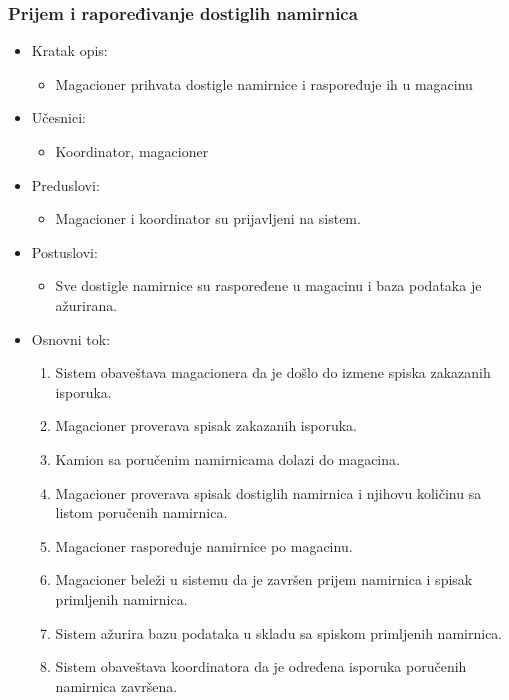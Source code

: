 
\subsubsection{Prijem i rapoređivanje dostiglih namirnica}

	\begin{itemize}
		\item{Kratak opis:} 
		\begin{itemize}
			\item{Magacioner prihvata dostigle namirnice i raspoređuje ih u magacinu}
		\end{itemize}
		\item{Učesnici:} 
		\begin{itemize}
			\item{Koordinator, magacioner}
		\end{itemize}		
		
		\item{Preduslovi:}
		\begin{itemize}
			\item{Magacioner i koordinator su prijavljeni na sistem.}
		\end{itemize}
		
		\item{Postuslovi:}
		\begin{itemize}
			\item{Sve dostigle namirnice su raspoređene u magacinu i baza podataka je ažurirana.}
		\end{itemize}
		
		\item{Osnovni tok:}
		\begin{enumerate}
			\item{Sistem obaveštava magacionera da je došlo do izmene spiska zakazanih isporuka.}
			\item{Magacioner proverava spisak zakazanih isporuka.}
			\item{Kamion sa poručenim namirnicama dolazi do magacina.}
			\item{Magacioner proverava spisak dostiglih namirnica i njihovu količinu sa listom poručenih namirnica.}
			\item{Magacioner raspoređuje namirnice po magacinu.}
			\item{Magacioner beleži u sistemu da je završen prijem namirnica i spisak primljenih namirnica.}
			\item{Sistem ažurira bazu podataka u skladu sa spiskom primljenih namirnica.}
			\item{Sistem obaveštava koordinatora da je određena isporuka poručenih namirnica završena.}
		\end{enumerate}
		

\end{itemize}
